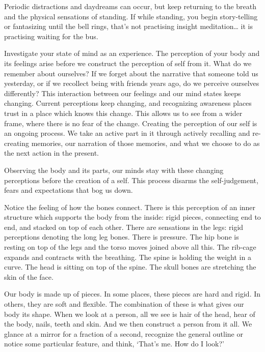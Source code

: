 Periodic distractions and daydreams can occur, but keep returning to the
breath and the physical sensations of standing. If while standing, you
begin story-telling or fantasizing until the bell rings, that's not
practising insight meditation\ldots{} it is practising waiting for the
bus.


\enlargethispage{\baselineskip}

Investigate your state of mind as an experience. The perception of your
body and its feelings arise before we construct the perception of self
from it. What do we remember about ourselves? If we forget about the
narrative that someone told us yesterday, or if we recollect being with
friends years ago, do we perceive ourselves differently? This
interaction between our feelings and our mind states keeps changing.
Current perceptions keep changing, and recognizing awareness places
trust in a place which knows this change. This allows us to see from a
wider frame, where there is no fear of the change. Creating the
perception of our self is an ongoing process. We take an active part in
it through actively recalling and re-creating memories, our narration of
those memories, and what we choose to do as the next action in the
present.


Observing the body and its parts, our minds stay with these changing
perceptions before the creation of a self. This process disarms the
self-judgement, fears and expectations that bog us down.

Notice the feeling of how the bones connect. There is this perception of
an inner structure which supports the body from the inside: rigid
pieces, connecting end to end, and stacked on top of each other. There
are sensations in the legs: rigid perceptions denoting the long leg
bones. There is pressure. The hip bone is resting on top of the legs and
the torso moves joined above all this. The rib-cage expands and
contracts with the breathing. The spine is holding the weight in a
curve. The head is sitting on top of the spine. The skull bones are
stretching the skin of the face.

Our body is made up of pieces. In some places, these pieces are hard and
rigid. In others, they are soft and flexible. The combination of these
is what gives our body its shape. When we look at a person, all we see
is hair of the head, hear of the body, nails, teeth and skin. And we
then construct a person from it all. We glance at a mirror for a
fraction of a second, recognize the general outline or notice some
particular feature, and think, `That's me. How do I look?'

